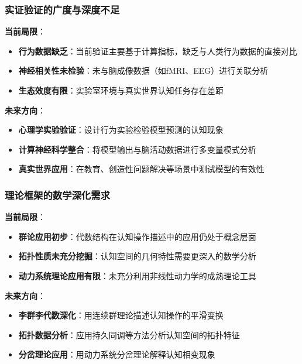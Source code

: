 \documentclass[12pt,a4paper]{article}
\begin{document}
\subsubsection{实证验证的广度与深度不足}

\textbf{当前局限}：
\begin{itemize}
\item \textbf{行为数据缺乏}：当前验证主要基于计算指标，缺乏与人类行为数据的直接对比
\item \textbf{神经相关性未检验}：未与脑成像数据（如fMRI、EEG）进行关联分析
\item \textbf{生态效度有限}：实验室环境与真实世界认知任务存在差距
\end{itemize}

\textbf{未来方向}：
\begin{itemize}
\item \textbf{心理学实验验证}：设计行为实验检验模型预测的认知现象
\item \textbf{计算神经科学整合}：将模型输出与脑活动数据进行多变量模式分析
\item \textbf{真实世界应用}：在教育、创造性问题解决等场景中测试模型的有效性
\end{itemize}

\subsubsection{理论框架的数学深化需求}

\textbf{当前局限}：
\begin{itemize}
\item \textbf{群论应用初步}：代数结构在认知操作描述中的应用仍处于概念层面
\item \textbf{拓扑性质未充分挖掘}：认知空间的几何特性需要更深入的数学分析
\item \textbf{动力系统理论应用有限}：未充分利用非线性动力学的成熟理论工具
\end{itemize}

\textbf{未来方向}：
\begin{itemize}
\item \textbf{李群李代数深化}：用连续群理论描述认知操作的平滑变换
\item \textbf{拓扑数据分析}：应用持久同调等方法分析认知空间的拓扑特征
\item \textbf{分岔理论应用}：用动力系统分岔理论解释认知相变现象
\end{itemize}
\end{document}
